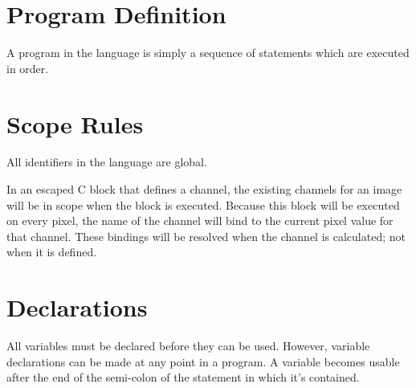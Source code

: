 \section{Program Definition}
A program in the \sys{} language is simply a sequence of statements which
are executed in order.

\section{Scope Rules}
All identifiers in the \sys{} language are global.

In an escaped C block that defines a channel, the existing channels
for an image will be in scope when the block is executed. Because
this block will be executed on every pixel, the name of the channel
will bind to the current pixel value for that channel. These bindings
will be resolved when the channel is calculated; not when it is
defined.

\section{Declarations}
All variables must be declared before they can be used. However,
variable declarations can be made at any point in a program.
A variable becomes usable after the end of the semi-colon of the statement
in which it's contained.
